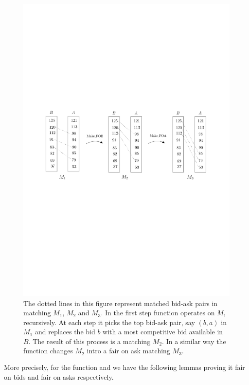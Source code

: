 \documentclass[a4paper,UKenglish,cleveref, autoref]{lipics-v2019}
\begin{document}
\begin{figure}[h!]
\centering
\includegraphics[width=.6\textwidth]{make_fair.pdf}
\caption{The dotted lines in this figure represent  matched bid-ask pairs in  matching $M_1$, $M_2$ and $M_3$. In the first step function  operates on $M_1$ recursively. At each step it picks the top bid-ask pair, say $(b,a)$ in $M_1$ and replaces the bid  $b$ with a most competitive bid available in $B$. The result of this process is a  matching $M_2$. In a similar way the function  changes $M_2$ intro a fair on ask matching $M_3$.  }
\label{fig:fair}
\end{figure}

More precisely, for the function  and  we have the following lemmas proving it fair on bids and fair on asks respectively. 
\begin{lemma}\label{lem:fob}
\end{lemma}

\begin{lemma}\label{lem:foa}
\end{lemma}

\begin{theorem}\label{thm:fairMatching}
\end{theorem}
\end{document}
